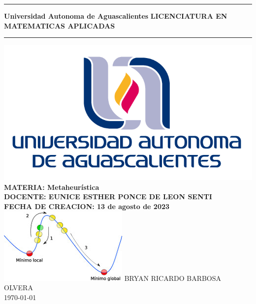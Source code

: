 \documentclass[10pt,a4paper]{article}
\begin{document}
\begin{titlepage}
\begin{center}
\vspace*{2\baselineskip}%
\hrule height 3pt
\vspace*{0.5\baselineskip}%
{\Huge \textbf{Universidad Autonoma de Aguascalientes}}
{\Large \textbf{LICENCIATURA EN MATEMATICAS APLICADAS}}
\vspace*{0.5\baselineskip}%
\hrule
\vspace*{0.5\baselineskip}%
\includegraphics[scale=0.5]{figuras/logo}
\vspace*{2\baselineskip} \\%
\textbf{\large MATERIA: Metaheurística} \\
\vspace*{1.5\baselineskip}
\textbf{\large DOCENTE: EUNICE ESTHER PONCE DE LEON SENTI } \\
\vspace*{1.5\baselineskip}
\textbf{\large FECHA DE CREACION: 13 de agosto de 2023} \\  
\vspace*{3\baselineskip}
\includegraphics[scale=1.2]{figuras/imagen}
\vfill
BRYAN RICARDO BARBOSA OLVERA \\
\today \\

\end{center}
\end{titlepage}
\end{document}
